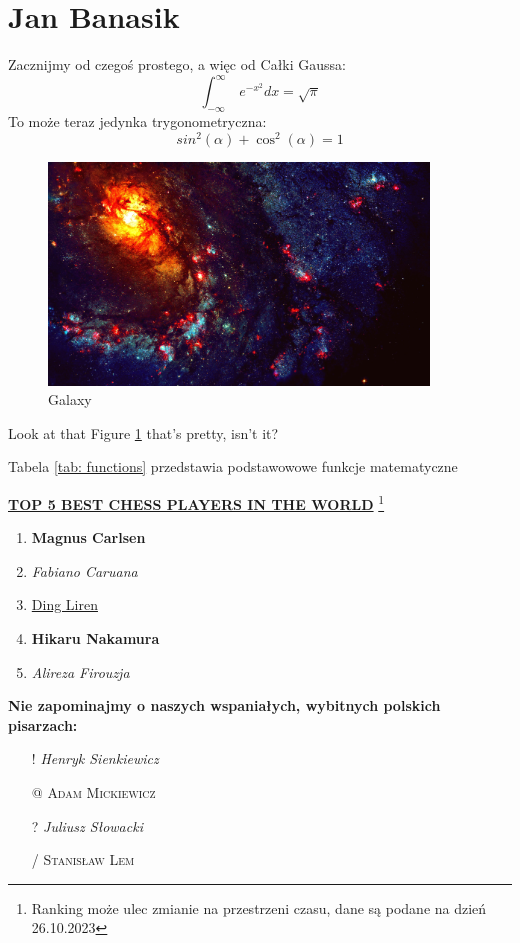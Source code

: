 \section{Jan Banasik}
\label{sec: jbanasik}

Zacznijmy od czegoś prostego, a więc od Całki Gaussa:
\[ \int_{-\infty}^{\infty}\ e^{-x^2} dx = \sqrt{\pi} \]
To może teraz jedynka trygonometryczna: \[ sin^{2}(\alpha) + \cos^{2}(\alpha)= 1 \]

\begin{figure}[h!]
    \centering
    \includegraphics[width = 0.9\textwidth]{pictures/galaxy.jpg}
    \caption{Galaxy}
    \label{fig:galaxy}
\end{figure}

Look at that Figure \ref{fig:galaxy} that's pretty, isn't it? 



Tabela \ref{tab: functions} przedstawia podstawowowe funkcje matematyczne 
\newpage

\href{https://www.chess.com/players}{\textbf{TOP 5 BEST CHESS PLAYERS IN THE WORLD}} \footnote{Ranking może ulec zmianie na przestrzeni czasu, dane są podane na dzień 26.10.2023}
\begin{enumerate}
    \item  \textbf{Magnus Carlsen}
    \item  \textit{Fabiano Caruana}
    \item  \underline{Ding Liren}
    \item  \textbf{Hikaru Nakamura}
    \item  \textit{Alireza Firouzja} \newline\newline
\end{enumerate}



\textbf{Nie zapominajmy o naszych wspaniałych, wybitnych polskich pisarzach:}
\begin{itemize}
    \item[!] \emph{Henryk Sienkiewicz}
    \item[@] \textsc{Adam Mickiewicz}
    \item[?] \emph{Juliusz Słowacki}
    \item[/] \textsc{Stanisław Lem} \\
\end{itemize}

